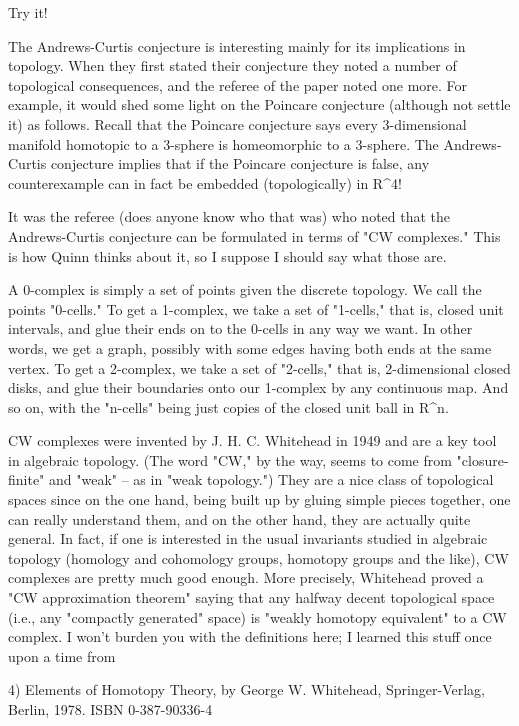 Try it!

The Andrews-Curtis conjecture is interesting mainly for its implications
in topology.  When they first stated their conjecture they noted a
number of topological consequences, and the referee of the paper noted
one more.  For example, it would shed some light on the Poincare
conjecture (although not settle it) as follows.  Recall that the
Poincare conjecture says every 3-dimensional manifold homotopic to a
3-sphere is homeomorphic to a 3-sphere.  The Andrews-Curtis conjecture
implies that if the Poincare conjecture is false, any counterexample can
in fact be embedded (topologically) in R^4!

It was the referee (does anyone know who that was) who noted that 
the Andrews-Curtis conjecture can be formulated in terms of
"CW complexes."  This is how Quinn thinks about it, so I suppose I
should say what those are.   

A 0-complex is simply a set of points given the discrete topology.  We
call the points "0-cells."   To get a 1-complex, we take a set of
"1-cells," that is, closed unit intervals, and glue their ends on to the
0-cells in any way we want.  In other words, we get a graph, possibly
with some edges having both ends at the same vertex.  To get a
2-complex, we take a set of "2-cells," that is, 2-dimensional closed
disks, and glue their boundaries onto our 1-complex by any continuous
map.  And so on, with the "n-cells" being just copies of the closed unit
ball in R^n. 

CW complexes were invented by J. H. C. Whitehead in 1949 and are a key tool
in algebraic topology.  (The word "CW," by the way, seems to come from
"closure-finite" and "weak" -- as in "weak topology.")  They are a
nice class of topological spaces since on the one hand, being built up
by gluing simple pieces together, one can really understand them, and on
the other hand, they are actually quite general.  In fact, if one is
interested in the usual invariants studied in algebraic topology
(homology and cohomology groups, homotopy groups and the like), CW
complexes are pretty much good enough. More precisely, Whitehead proved
a "CW approximation theorem" saying that any halfway decent topological
space (i.e., any "compactly generated" space) is "weakly homotopy
equivalent" to a CW complex.  I won't burden you with the definitions
here; I learned this stuff once upon a time from 

4) Elements of Homotopy Theory, by George W. Whitehead, Springer-Verlag,
Berlin, 1978.  ISBN 0-387-90336-4


